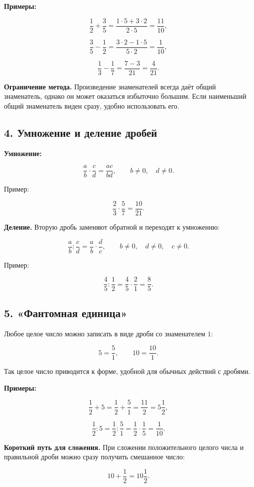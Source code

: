 \documentclass[a4paper,12pt]{article}
\begin{document}
\textbf{Примеры:}

\[
\frac12+\frac35
=
\frac{1\cdot5+3\cdot2}{2\cdot5}
=
\frac{11}{10},
\]

\[
\frac35-\frac12
=
\frac{3\cdot2-1\cdot5}{5\cdot2}
=
\frac1{10},
\]

\[
\frac13-\frac17
=
\frac{7-3}{21}
=
\frac4{21}.
\]

\textbf{Ограничение метода.}
Произведение знаменателей всегда даёт общий знаменатель,
однако он может оказаться избыточно большим.
Если наименьший общий знаменатель виден сразу,
удобно использовать его.

\subsection*{4. Умножение и деление дробей}

\textbf{Умножение:}

\[
\frac{a}{b}\cdot\frac{c}{d}
=
\frac{ac}{bd},
\qquad
b\ne0,
\quad
d\ne0.
\]

Пример:

\[
\frac23\cdot\frac57
=
\frac{10}{21}.
\]

\textbf{Деление.}
Вторую дробь заменяют обратной и переходят к умножению:

\[
\frac{a}{b}:\frac{c}{d}
=
\frac{a}{b}\cdot\frac{d}{c},
\qquad
b\ne0,
\quad
d\ne0,
\quad
c\ne0.
\]

Пример:

\[
\frac45:\frac12
=
\frac45\cdot\frac21
=
\frac85.
\]

\subsection*{5. «Фантомная единица»}

Любое целое число можно записать в виде дроби
со знаменателем \(1\):

\[
5=\frac51,
\qquad
10=\frac{10}{1}.
\]

Так целое число приводится к форме,
удобной для обычных действий с дробями.

\textbf{Примеры:}

\[
\frac12+5
=
\frac12+\frac51
=
\frac{11}{2}
=
5\frac12,
\]

\[
\frac12:5
=
\frac12:\frac51
=
\frac12\cdot\frac15
=
\frac1{10}.
\]

\textbf{Короткий путь для сложения.}
При сложении положительного целого числа
и правильной дроби можно сразу получить смешанное число:

\[
10+\frac12=10\frac12.
\]
\end{document}
